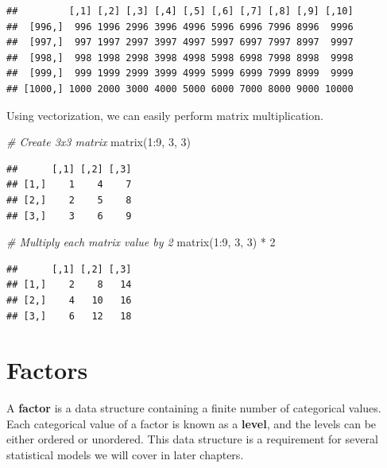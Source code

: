 \documentclass[
]{book}
\newenvironment{Shaded}{\begin{snugshade}}{\end{snugshade}}
\newcommand{\CommentTok}[1]{\textcolor[rgb]{0.56,0.35,0.01}{\textit{#1}}}
\newcommand{\DecValTok}[1]{\textcolor[rgb]{0.00,0.00,0.81}{#1}}
\newcommand{\FunctionTok}[1]{\textcolor[rgb]{0.00,0.00,0.00}{#1}}
\newcommand{\NormalTok}[1]{#1}
\newcommand{\SpecialCharTok}[1]{\textcolor[rgb]{0.00,0.00,0.00}{#1}}
\begin{document}
\begin{verbatim}
##         [,1] [,2] [,3] [,4] [,5] [,6] [,7] [,8] [,9] [,10]
##  [996,]  996 1996 2996 3996 4996 5996 6996 7996 8996  9996
##  [997,]  997 1997 2997 3997 4997 5997 6997 7997 8997  9997
##  [998,]  998 1998 2998 3998 4998 5998 6998 7998 8998  9998
##  [999,]  999 1999 2999 3999 4999 5999 6999 7999 8999  9999
## [1000,] 1000 2000 3000 4000 5000 6000 7000 8000 9000 10000
\end{verbatim}

Using vectorization, we can easily perform matrix multiplication.

\begin{Shaded}
\begin{Highlighting}[]
\CommentTok{\# Create 3x3 matrix}
\FunctionTok{matrix}\NormalTok{(}\DecValTok{1}\SpecialCharTok{:}\DecValTok{9}\NormalTok{, }\DecValTok{3}\NormalTok{, }\DecValTok{3}\NormalTok{)}
\end{Highlighting}
\end{Shaded}

\begin{verbatim}
##      [,1] [,2] [,3]
## [1,]    1    4    7
## [2,]    2    5    8
## [3,]    3    6    9
\end{verbatim}

\begin{Shaded}
\begin{Highlighting}[]
\CommentTok{\# Multiply each matrix value by 2}
\FunctionTok{matrix}\NormalTok{(}\DecValTok{1}\SpecialCharTok{:}\DecValTok{9}\NormalTok{, }\DecValTok{3}\NormalTok{, }\DecValTok{3}\NormalTok{) }\SpecialCharTok{*} \DecValTok{2}
\end{Highlighting}
\end{Shaded}

\begin{verbatim}
##      [,1] [,2] [,3]
## [1,]    2    8   14
## [2,]    4   10   16
## [3,]    6   12   18
\end{verbatim}

\hypertarget{factors}{%
\section{Factors}\label{factors}}

A \textbf{factor} is a data structure containing a finite number of categorical values. Each categorical value of a factor is known as a \textbf{level}, and the levels can be either ordered or unordered. This data structure is a requirement for several statistical models we will cover in later chapters.
\end{document}
